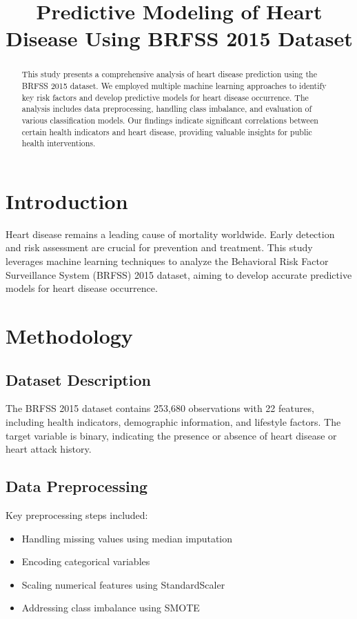 \documentclass[conference]{IEEEtran}
\begin{document}
\title{Predictive Modeling of Heart Disease Using BRFSS 2015 Dataset}

\author{
}

\maketitle

\begin{abstract}
This study presents a comprehensive analysis of heart disease prediction using the BRFSS 2015 dataset. We employed multiple machine learning approaches to identify key risk factors and develop predictive models for heart disease occurrence. The analysis includes data preprocessing, handling class imbalance, and evaluation of various classification models. Our findings indicate significant correlations between certain health indicators and heart disease, providing valuable insights for public health interventions.
\end{abstract}

\section{Introduction}
Heart disease remains a leading cause of mortality worldwide. Early detection and risk assessment are crucial for prevention and treatment. This study leverages machine learning techniques to analyze the Behavioral Risk Factor Surveillance System (BRFSS) 2015 dataset, aiming to develop accurate predictive models for heart disease occurrence.

\section{Methodology}
\subsection{Dataset Description}
The BRFSS 2015 dataset contains 253,680 observations with 22 features, including health indicators, demographic information, and lifestyle factors. The target variable is binary, indicating the presence or absence of heart disease or heart attack history.

\subsection{Data Preprocessing}
Key preprocessing steps included:
\begin{itemize}
    \item Handling missing values using median imputation
    \item Encoding categorical variables
    \item Scaling numerical features using StandardScaler
    \item Addressing class imbalance using SMOTE
\end{itemize}
\end{document}

